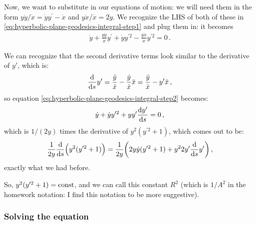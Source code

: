 \documentclass[main.tex]{subfiles}
\begin{document}
Now, we want to substitute in our equations of motion: we will need them in the form \(y \ddot{y} / \dot{x} = \dot{y} y^{\prime } - \dot{x}\) and \(y \ddot{x} / \dot{x} = 2 \dot{y}\).
We recognize the LHS of both of these in \eqref{eq:hyperbolic-plane-geodesics-integral-step1} and plug them in: it becomes
%
\begin{align} \label{eq:hyperbolic-plane-geodesics-integral-step2}
  \dot{y} + \frac{y \ddot{y}}{\dot{x}} y^{\prime } + \dot{y} y^{\prime 2} - \frac{y \ddot{x}}{\dot{x}} y^{\prime 2} = 0
\,.
\end{align}

We can recognize that the second derivative terms look similar to the derivative of \(y'\), which is:
%
\begin{align}
  \dv[]{}{s} y^{\prime } 
  = \frac{\ddot{y}}{\dot{x}} - \frac{\dot{y}}{\dot{x}
  } \ddot{x}
  = \frac{\ddot{y}}{\dot{x}} - y^{\prime } \ddot{x}
\,,
\end{align}
%
so equation \eqref{eq:hyperbolic-plane-geodesics-integral-step2} becomes:
%
\begin{align}
  \dot{y} + \dot{y} y^{\prime 2} + y y^{\prime } \dv{y'}{s}=0
\,,
\end{align}
%
which is \(1/(2y)\) times the derivative of \(y^2 (y^{\prime 2} + 1)\), which comes out to be: 
%
\begin{align}
  \frac{1}{2y}
  \dv{}{s} \qty(y^2 (y^{\prime 2} + 1))
  = \frac{1}{2y}\qty(2 y \dot{y} 
  (y^{\prime 2} + 1)
  + y^2 2 y^{\prime } \dv{}{s} y^{\prime })
\,,
\end{align}
%
exactly what we had before.

So, \(y^2 (y^{\prime 2} + 1) = \text{const}\), and we can call this constant \(R^2\) (which is \(1/A^2\) in the homework notation: I find this notation to be more suggestive).

\subsubsection{Solving the equation}
\end{document}
